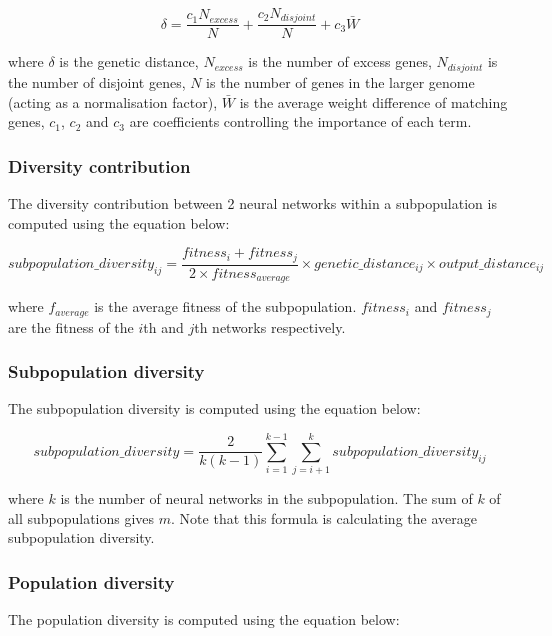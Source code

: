 \documentclass{article}
\begin{document}
\begin{equation}
    \label{equation:neat_ncl_genetic_distance}
    \delta = \frac{c_1 N_{excess}}{N} + \frac{c_2 N_{disjoint}}{N} + c_3 \bar{W}
\end{equation}

where $\delta$ is the genetic distance, $N_{excess}$ is the number of excess genes, $N_{disjoint}$ is the number of disjoint genes, $N$ is the number of genes in the larger genome (acting as a normalisation factor), $\bar{W}$ is the average weight difference of matching genes, $c_1$, $c_2$ and $c_3$ are coefficients controlling the importance of each term. 


\subsubsection{Diversity contribution}
The diversity contribution between 2 neural networks within a subpopulation is computed using the equation below: 
    
\begin{equation}
    \label{equation:neat_ncl_diversity_contribution}
    subpopulation\_diversity_{ij} = \frac{fitness_i + fitness_{j}}{2 \times fitness_{average}} \times genetic\_distance_{ij} \times output\_distance_{ij}
\end{equation}

where $f_{average}$ is the average fitness of the subpopulation. $fitness_i$ and $fitness_j$ are the fitness of the $i$th and $j$th networks respectively. 


\subsubsection{Subpopulation diversity}
The subpopulation diversity is computed using the equation below: 

\begin{equation}
    \label{equation:neat_ncl_subpopulation_diversity}
    subpopulation\_diversity = \frac{2}{k(k - 1)} \sum_{i = 1}^{k - 1} \sum_{j = i + 1}^k subpopulation\_diversity_{ij}
\end{equation}

where $k$ is the number of neural networks in the subpopulation. The sum of $k$ of all subpopulations gives $m$. Note that this formula is calculating the average subpopulation diversity. 


\subsubsection{Population diversity}
The population diversity is computed using the equation below: 
    
\end{document}
